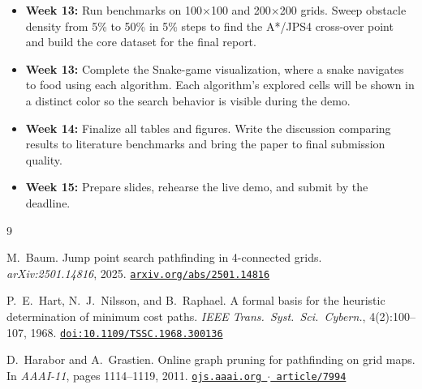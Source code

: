 \documentclass[11pt,twocolumn,a4paper]{article}
\begin{document}
\begin{itemize}
  \item \textbf{Week 13:} Run benchmarks on 100$\times$100 and
    200$\times$200 grids. Sweep obstacle density from 5\% to 50\% in 5\%
    steps to find the A*/JPS4 cross-over point and build the core dataset
    for the final report.

  \item \textbf{Week 13:} Complete the Snake-game visualization, where
    a snake navigates to food using each algorithm. Each algorithm's explored
    cells will be shown in a distinct color so the search behavior is visible
    during the demo.

  \item \textbf{Week 14:} Finalize all tables and figures. Write the
    discussion comparing results to literature benchmarks and bring the
    paper to final submission quality.

  \item \textbf{Week 15:} Prepare slides, rehearse the live demo, and
    submit by the deadline.
\end{itemize}

\begin{thebibliography}{9}

M.~Baum.
\newblock Jump point search pathfinding in 4-connected grids.
\newblock \emph{arXiv:2501.14816}, 2025.
\newblock \href{https://arxiv.org/abs/2501.14816}{\texttt{arxiv.org/abs/2501.14816}}

P.~E.~Hart, N.~J.~Nilsson, and B.~Raphael.
\newblock A formal basis for the heuristic determination of minimum cost paths.
\newblock \emph{IEEE Trans.\ Syst.\ Sci.\ Cybern.}, 4(2):100--107, 1968.
\newblock \href{https://doi.org/10.1109/TSSC.1968.300136}{\texttt{doi:10.1109/TSSC.1968.300136}}

D.~Harabor and A.~Grastien.
\newblock Online graph pruning for pathfinding on grid maps.
\newblock In \emph{AAAI-11}, pages 1114--1119, 2011.
\newblock \href{https://ojs.aaai.org/index.php/AAAI/article/view/7994}{\texttt{ojs.aaai.org $\cdot$ article/7994}}

\end{thebibliography}
\end{document}
